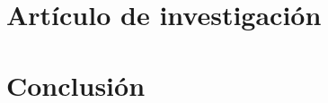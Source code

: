 \documentclass{article}
\theoremstyle{theorem-style}  %
\theoremstyle{definition}
\theoremstyle{example-style}
\begin{document}

\section{Artículo de investigación} \label{sec:paper}


\section{Conclusión} \label{sec:conclusion}



\printbibliography
\end{document}
